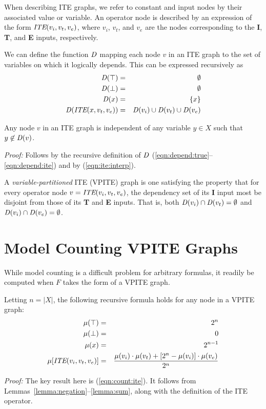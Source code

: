 \documentclass{llncs}
\newcommand{\tautology}{\top}
\newcommand{\nil}{\bot}
\newcommand{\ite}{\mbox{\it ITE}}
\newcommand{\mcount}{\mu}
\newcommand{\ifarg}{\textbf{I}}
\newcommand{\thenarg}{\textbf{T}}
\newcommand{\elsearg}{\textbf{E}}
\newcommand{\depend}{{\it D}}
\begin{document}
When describing ITE graphs, we refer to constant and input
nodes by their associated value or variable.  An operator node is described by an expression of the form
$\ite(v_i, v_t, v_e)$, where $v_i$, $v_t$, and $v_e$ are the
nodes corresponding to the \ifarg{}, \thenarg{}, and \elsearg{} inputs, respectively.

We can define the function $\depend$ mapping each node
$v$ in an ITE graph to the set of variables on which it logically depends.  This can be expressed recursively as
\begin{eqnarray}
\depend(\tautology) & = & \emptyset \label{eqn:depend:true}\\
\depend(\nil) & = & \emptyset \label{eqn:depend:false}\\
\depend(x) & = & \{x \} \label{eqn:depend:variable}\\
\depend(\ite(x, v_t, v_e)) & = & \depend(v_i) \cup \depend(v_t) \cup \depend(v_e) \label{eqn:depend:ite}
\end{eqnarray}  


\begin{lemma}
\label{lemma:independent:dset}
Any node $v$ in an ITE graph is independent of any variable $y \in X$ such that $y \not \in \depend(v)$.
\end{lemma}  
\noindent
{\em Proof:} Follows by the recursive definition of $\depend$ (\ref{eqn:depend:true}--\ref{eqn:depend:ite}) and by (\ref{eqn:ite:interp}).

A {\em variable-partitioned} ITE (VPITE) graph is one satisfying the property
that for every operator node $v = \ite(v_i, v_t, v_e)$, the dependency
set of its \ifarg{} input most be disjoint from those of its
\thenarg{} and \elsearg{} inputs.  That is, both $\depend(v_i) \cap \depend(v_t) = \emptyset$ and
$\depend(v_i) \cap \depend(v_e) = \emptyset$.

\section{Model Counting VPITE Graphs}

While model counting is a difficult problem for arbitrary
formulas, it readily be computed when $F$ takes the form of a VPITE graph.

\begin{theorem}
\label{theorem:count}
Letting $n = |X|$, the following recursive formula holds for any node in a VPITE graph:
\begin{eqnarray}
\mcount(\tautology) & = & 2^{n} \label{eqn:count:true}\\
\mcount(\nil) & = & 0 \label{eqn:count:false}\\
\mcount(x) & = & 2^{n-1} \label{eqn:count:variable}\\
\mcount[\ite(v_i, v_t, v_e)] & = & \frac{\mcount(v_i) \cdot \mcount(v_t) + [2^n-\mcount(v_i)] \cdot \mcount(v_e)}{2^n} \label{eqn:count:ite}
\end{eqnarray}  
\end{theorem}
\noindent
{\em Proof:} The key result here is (\ref{eqn:count:ite}).  It follows
from Lemmas~\ref{lemma:negation}--\ref{lemma:sum}, along with the definition of the ITE operator.
\end{document}
